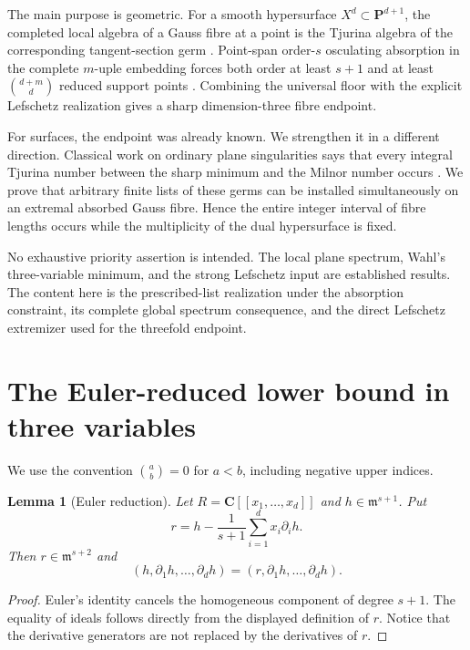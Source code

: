 \documentclass[11pt]{article}
\newtheorem{lemma}[theorem]{Lemma}
\theoremstyle{remark}
\newcommand{\PP}{\mathbf P}
\newcommand{\m}{\mathfrak m}
\begin{document}
The main purpose is geometric.  For a smooth hypersurface
\(X^d\subset\PP^{d+1}\), the completed local algebra of a Gauss fibre at a
point is the Tjurina algebra of the corresponding tangent-section germ
\cite{ErikssonGauss2026}.  Point-span order-\(s\) osculating absorption in
the complete \(m\)-uple embedding forces both order at least \(s+1\) and at
least \(\binom{d+m}{d}\) reduced support points
\cite{ErikssonOsculating2026,ErikssonEuler2026}.  Combining the universal
floor with the explicit Lefschetz realization gives a sharp
dimension-three fibre endpoint.

For surfaces, the endpoint was already known.  We strengthen it in a
different direction.  Classical work on ordinary plane singularities says
that every integral Tjurina number between the sharp minimum and the Milnor
number occurs \cite{BGM1988,CaninoEtAl2025,CaninoEtAlArxiv}.  We prove that
arbitrary finite lists of these germs can be installed simultaneously on an
extremal absorbed Gauss fibre.  Hence the entire integer interval of fibre
lengths occurs while the multiplicity of the dual hypersurface is fixed.

No exhaustive priority assertion is intended.  The local plane spectrum,
Wahl's three-variable minimum, and the strong Lefschetz input are
established results.  The content here is the prescribed-list realization
under the absorption constraint, its complete global spectrum consequence,
and the direct Lefschetz extremizer used for the threefold endpoint.

\section{The Euler-reduced lower bound in three variables}

We use the convention \(\binom ab=0\) for \(a<b\), including negative
upper indices.

\begin{lemma}[Euler reduction]\label{lem:euler}
Let \(R=\mathbf C[[x_1,\ldots,x_d]]\) and
\(h\in\m^{s+1}\).  Put
\[
 r=h-\frac1{s+1}\sum_{i=1}^d x_i\partial_i h.
\]
Then \(r\in\m^{s+2}\) and
\[
 (h,\partial_1h,\ldots,\partial_dh)
 =(r,\partial_1h,\ldots,\partial_dh).
\]
\end{lemma}

\begin{proof}
Euler's identity cancels the homogeneous component of degree \(s+1\).
The equality of ideals follows directly from the displayed definition of
\(r\).  Notice that the derivative generators are not replaced by the
derivatives of \(r\).
\end{proof}
\end{document}
